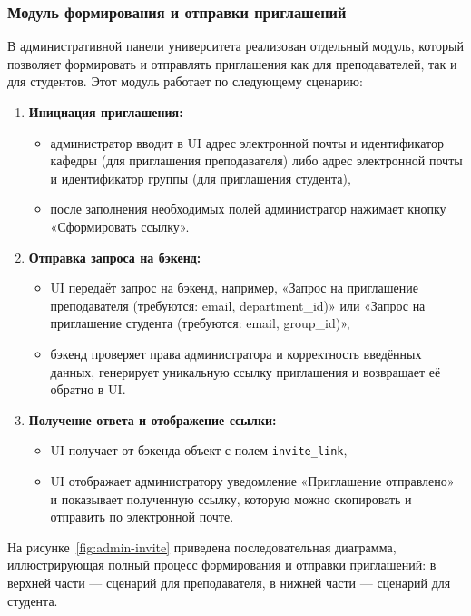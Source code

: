 \subsubsection{Модуль формирования и отправки приглашений}
В административной панели университета реализован отдельный модуль, который позволяет формировать и отправлять приглашения как для преподавателей, так и для студентов. Этот модуль работает по следующему сценарию:

\begin{enumerate}
    \item \textbf{Инициация приглашения:} 
    \begin{itemize}
        \item администратор вводит в UI адрес электронной почты и идентификатор кафедры (для приглашения преподавателя) либо адрес электронной почты и идентификатор группы (для приглашения студента),
        \item после заполнения необходимых полей администратор нажимает кнопку «Сформировать ссылку».
    \end{itemize}
    \item \textbf{Отправка запроса на бэкенд:} 
    \begin{itemize}
        \item UI передаёт запрос на бэкенд, например, «Запрос на приглашение преподавателя (требуются: email, department\_id)» или «Запрос на приглашение студента (требуются: email, group\_id)»,
        \item бэкенд проверяет права администратора и корректность введённых данных, генерирует уникальную ссылку приглашения и возвращает её обратно в UI.
    \end{itemize}
    \item \textbf{Получение ответа и отображение ссылки:} 
    \begin{itemize}
        \item UI получает от бэкенда объект с полем \texttt{invite\_link},
        \item UI отображает администратору уведомление «Приглашение отправлено» и показывает полученную ссылку, которую можно скопировать и отправить по электронной почте.
    \end{itemize}
\end{enumerate}

На рисунке~\ref{fig:admin-invite} приведена последовательная диаграмма, иллюстрирующая полный процесс формирования и отправки приглашений: в верхней части — сценарий для преподавателя, в нижней части — сценарий для студента.

